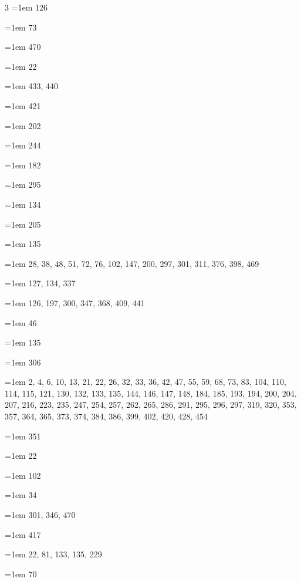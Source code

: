 \begin{multicols}{3}
\hangindent=1em  126\par
\hangindent=1em  73\par
\hangindent=1em  470\par
\hangindent=1em  22\par
\hangindent=1em  433, 440\par
\hangindent=1em  421\par
\hangindent=1em  202\par
\hangindent=1em  244\par
\hangindent=1em  182\par
\hangindent=1em  295\par
\hangindent=1em  134\par
\hangindent=1em  205\par
\hangindent=1em  135\par
\hangindent=1em  28, 38, 48, 51, 72, 76, 102, 147, 200, 297, 301, 311, 376, 398, 469\par
\hangindent=1em  127, 134, 337\par
\hangindent=1em  126, 197, 300, 347, 368, 409, 441\par
\hangindent=1em  46\par
\hangindent=1em  135\par
\hangindent=1em  306\par
\hangindent=1em  2, 4, 6, 10, 13, 21, 22, 26, 32, 33, 36, 42, 47, 55, 59, 68, 73, 83, 104, 110, 114, 115, 121, 130, 132, 133, 135, 144, 146, 147, 148, 184, 185, 193, 194, 200, 204, 207, 216, 223, 235, 247, 254, 257, 262, 265, 286, 291, 295, 296, 297, 319, 320, 353, 357, 364, 365, 373, 374, 384, 386, 399, 402, 420, 428, 454\par
\hangindent=1em  351\par
\hangindent=1em  22\par
\hangindent=1em  102\par
\hangindent=1em  34\par
\hangindent=1em  301, 346, 470\par
\hangindent=1em  417\par
\hangindent=1em  22, 81, 133, 135, 229\par
\hangindent=1em  70\par

\end{multicols}
